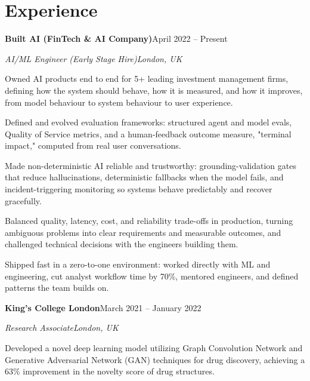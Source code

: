 \documentclass[10pt,a4paper]{article}
\newcommand{\entry}[4]{%
  {\color{company}\bfseries #1}\hfill {\color{muted}#2}\par
  \vspace{1pt}
  {\itshape #3}\hfill {\color{muted}\itshape #4}\par
  \vspace{3pt}%
}
\begin{document}
\section{Experience}
\entry{Built AI (FinTech \& AI Company)}{April 2022 -- Present}{AI/ML Engineer (Early Stage Hire)}{London, UK}
\begin{tight}
  \item Owned AI products end to end for 5+ leading investment management firms, defining how the system should behave, how it is measured, and how it improves, from model behaviour to system behaviour to user experience.
  \item Defined and evolved evaluation frameworks: structured agent and model evals, Quality of Service metrics, and a human-feedback outcome measure, "terminal impact," computed from real user conversations.
  \item Made non-deterministic AI reliable and trustworthy: grounding-validation gates that reduce hallucinations, deterministic fallbacks when the model fails, and incident-triggering monitoring so systems behave predictably and recover gracefully.
  \item Balanced quality, latency, cost, and reliability trade-offs in production, turning ambiguous problems into clear requirements and measurable outcomes, and challenged technical decisions with the engineers building them.
  \item Shipped fast in a zero-to-one environment: worked directly with ML and engineering, cut analyst workflow time by 70\%, mentored engineers, and defined patterns the team builds on.
\end{tight}

\entry{King's College London}{March 2021 -- January 2022}{Research Associate}{London, UK}
\begin{tight}
  \item Developed a novel deep learning model utilizing Graph Convolution Network and Generative Adversarial Network (GAN) techniques for drug discovery, achieving a 63\% improvement in the novelty score of drug structures.
\end{tight}

\end{document}
